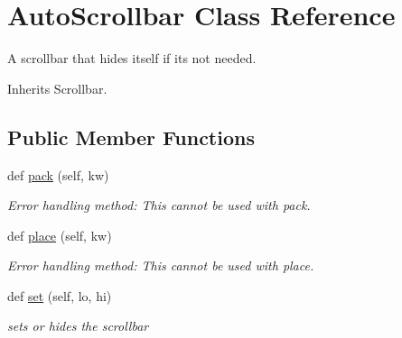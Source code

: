 \hypertarget{classgui_1_1winhelper_1_1AutoScrollbar}{}\section{Auto\+Scrollbar Class Reference}
\label{classgui_1_1winhelper_1_1AutoScrollbar}


A scrollbar that hides itself if it\textquotesingle{}s not needed.  




Inherits Scrollbar.

\subsection*{Public Member Functions}
\begin{DoxyCompactItemize}
\item 
def \hyperlink{classgui_1_1winhelper_1_1AutoScrollbar_a7a251b22287f6295a58ca328ef5bb9c0}{pack} (self, kw)\hypertarget{classgui_1_1winhelper_1_1AutoScrollbar_a7a251b22287f6295a58ca328ef5bb9c0}{}\label{classgui_1_1winhelper_1_1AutoScrollbar_a7a251b22287f6295a58ca328ef5bb9c0}

\begin{DoxyCompactList}\small\item\em Error handling method\+: This cannot be used with pack. \end{DoxyCompactList}\item 
def \hyperlink{classgui_1_1winhelper_1_1AutoScrollbar_ab2a60e5dcddfee5a63307a872be5f05e}{place} (self, kw)\hypertarget{classgui_1_1winhelper_1_1AutoScrollbar_ab2a60e5dcddfee5a63307a872be5f05e}{}\label{classgui_1_1winhelper_1_1AutoScrollbar_ab2a60e5dcddfee5a63307a872be5f05e}

\begin{DoxyCompactList}\small\item\em Error handling method\+: This cannot be used with place. \end{DoxyCompactList}\item 
def \hyperlink{classgui_1_1winhelper_1_1AutoScrollbar_a49ed94abbf42757ecc73a899148ea9ea}{set} (self, lo, hi)\hypertarget{classgui_1_1winhelper_1_1AutoScrollbar_a49ed94abbf42757ecc73a899148ea9ea}{}\label{classgui_1_1winhelper_1_1AutoScrollbar_a49ed94abbf42757ecc73a899148ea9ea}

\begin{DoxyCompactList}\small\item\em sets or hides the scrollbar \end{DoxyCompactList}\end{DoxyCompactItemize}


